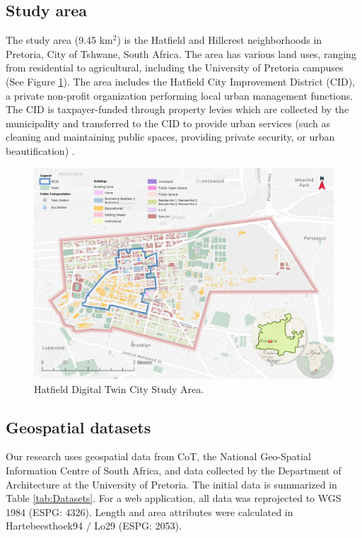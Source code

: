 \documentclass[authoryear,preprint,review,11pt,doubleblind]{elsarticle}
\begin{document}
    \subsection{Study area} \label{subsec:Study Area}
    The study area (9.45 km$^2$) is the Hatfield and Hillcrest neighborhoods in Pretoria, City of Tshwane, South Africa. The area has various land uses, ranging from residential to agricultural, including the University of Pretoria campuses (See Figure \ref{fig:studyArea}). The area includes the Hatfield City Improvement District (CID), a private non-profit organization performing local urban management functions. The CID is taxpayer-funded through property levies which are collected by the municipality and transferred to the  CID to provide urban services (such as cleaning and maintaining public spaces, providing private security, or urban beautification) \citep{cidHatfieldCIDBrochure2021}.
    \begin{figure}[h!]
        \centering
        \includegraphics[width=\linewidth]{Figures/Study Area+HICD.png}
        \caption{Hatfield Digital Twin City Study Area.}
        \label{fig:studyArea}
    \end{figure}
    \subsection{Geospatial datasets} \label{subsec:Geospatial}
    Our research uses geospatial data from CoT, the National Geo-Spatial Information Centre of South Africa, and data collected by the Department of Architecture at the University of Pretoria. The initial data is summarized in Table \ref{tab:Datasets}. For a web application, all data was reprojected to WGS 1984 (ESPG: 4326). Length and area attributes were calculated in Hartebeesthoek94 / Lo29 (ESPG: 2053).
\end{document}
